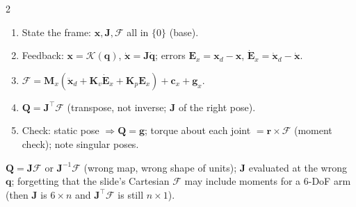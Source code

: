 \begin{multicols}{2}
\begin{worked}[Cartesian law gives the same torques as joint space; point masses $m_1=m_2=1$ kg at the link ends, same pose, at rest]
\end{worked}
\begin{recipe}
\begin{enumerate}
\item State the frame: $\mathbf x,\mathbf J,\mathcal F$ all in $\{0\}$ (base).
\item Feedback: $\mathbf x=\mathcal K(\mathbf q)$, $\dot{\mathbf x}=\mathbf J\dot{\mathbf q}$; errors $\mathbf E_x=\mathbf x_d-\mathbf x$, $\dot{\mathbf E}_x=\dot{\mathbf x}_d-\dot{\mathbf x}$.
\item $\mathcal F=\mathbf M_x(\ddot{\mathbf x}_d+\mathbf K_v\dot{\mathbf E}_x+\mathbf K_p\mathbf E_x)+\mathbf c_x+\mathbf g_x$.
\item $\mathbf Q=\mathbf J^\top\mathcal F$ (transpose, not inverse; $\mathbf J$ of the right pose).
\item Check: static pose $\Rightarrow\mathbf Q=\mathbf g$; torque about each joint $=\mathbf r\times\mathcal F$ (moment check); note singular poses.
\end{enumerate}
\end{recipe}
\begin{trap}
$\mathbf Q=\mathbf J\mathcal F$ or $\mathbf J^{-1}\mathcal F$ (wrong map, wrong shape of units); $\mathbf J$ evaluated at the wrong $\mathbf q$; forgetting that the slide's Cartesian $\mathcal F$ may include moments for a 6-DoF arm (then $\mathbf J$ is $6\times n$ and $\mathbf J^\top\mathcal F$ is still $n\times1$).
\end{trap}


\end{multicols}
